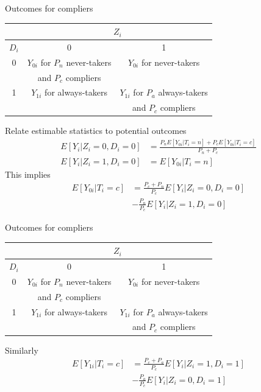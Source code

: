 \documentclass[notes=show,beamer,compress]{beamer}
\begin{document}
\begin{frame}{Outcomes for compliers}
	\begin{center}
		\begin{tabular}{|c|c|c|}
			\hline
			& \multicolumn{2}{|c|}{$Z_{i}$}                                      \\ \hline
			$D_{i}$ &                0                &                1                 \\ \hline
			0    & $Y_{0i}$ for $P_n$ never-takers &    $Y_{0i}$ for never-takers     \\
			&       and $P_c$ compliers       &                                  \\ \hline
			1    &   $Y_{1i}$ for always-takers    & $Y_{1i}$ for $P_a$ always-takers \\
			&                                 &       and $P_c$ compliers        \\ \hline
		\end{tabular}
	\end{center}
	Relate estimable statistics to potential outcomes
	\begin{align*}
		E[Y_{i}|Z_i=0, D_i=0] &= \frac{P_nE[Y_{0i}|T_i=n] + P_cE[Y_{0i}|T_i=c]}{P_n+P_c}\\
		E[Y_{i}|Z_i=1, D_i=0] &= E[Y_{0i}|T_i=n]
	\end{align*}
	This implies
	\begin{align*}
		E[Y_{0i}|T_i=c] &= \frac{P_c + P_n}{P_c}E[Y_{i}|Z_i=0, D_i=0]\\
		&- \frac{P_n}{P_c}E[Y_{i}|Z_i=1, D_i=0]
	\end{align*}
\end{frame}

\begin{frame}{Outcomes for compliers}
	\begin{center}
		\begin{tabular}{|c|c|c|}
			\hline
			& \multicolumn{2}{|c|}{$Z_{i}$}                                      \\ \hline
			$D_{i}$ &                0                &                1                 \\ \hline
			0    & $Y_{0i}$ for $P_n$ never-takers &    $Y_{0i}$ for never-takers     \\
			&       and $P_c$ compliers       &                                  \\ \hline
			1    &   $Y_{1i}$ for always-takers    & $Y_{1i}$ for $P_a$ always-takers \\
			&                                 &       and $P_c$ compliers        \\ \hline
		\end{tabular}
	\end{center}
	Similarly
	\begin{align*}
		E[Y_{1i}|T_i=c] &= \frac{P_c + P_a}{P_c}E[Y_{i}|Z_i=1, D_i=1]\\
		&- \frac{P_a}{P_c}E[Y_{i}|Z_i=0, D_i=1]
	\end{align*}
\end{frame}
\end{document}
